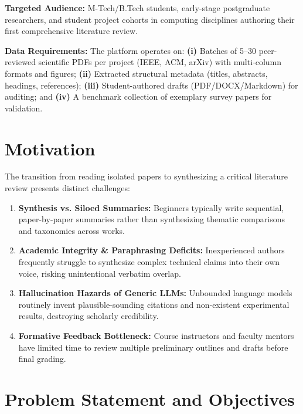 \documentclass[10pt,a4paper]{article}
\begin{document}
\textbf{Targeted Audience:} M-Tech/B.Tech students, early-stage postgraduate researchers, and student project cohorts in computing disciplines authoring their first comprehensive literature review.

\textbf{Data Requirements:} The platform operates on: \textbf{(i)} Batches of 5--30 peer-reviewed scientific PDFs per project (IEEE, ACM, arXiv) with multi-column formats and figures; \textbf{(ii)} Extracted structural metadata (titles, abstracts, headings, references); \textbf{(iii)} Student-authored drafts (PDF/DOCX/Markdown) for auditing; and \textbf{(iv)} A benchmark collection of exemplary survey papers for validation.

\section{Motivation}
The transition from reading isolated papers to synthesizing a critical literature review presents distinct challenges:
\begin{enumerate}
    \item \textbf{Synthesis vs. Siloed Summaries:} Beginners typically write sequential, paper-by-paper summaries rather than synthesizing thematic comparisons and taxonomies across works.
    \item \textbf{Academic Integrity \& Paraphrasing Deficits:} Inexperienced authors frequently struggle to synthesize complex technical claims into their own voice, risking unintentional verbatim overlap.
    \item \textbf{Hallucination Hazards of Generic LLMs:} Unbounded language models routinely invent plausible-sounding citations and non-existent experimental results, destroying scholarly credibility.
    \item \textbf{Formative Feedback Bottleneck:} Course instructors and faculty mentors have limited time to review multiple preliminary outlines and drafts before final grading.
\end{enumerate}

\section{Problem Statement and Objectives}
\end{document}
